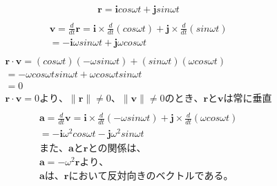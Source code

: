 \documentclass[dvipdfmx,uplatex]{jsarticle}
\begin{document}
  \begin{equation}
    \begin{aligned}
      &\bm{r} = \bm{i}cos\omega t + \bm{j}sin\omega t \nonumber\\
    \end{aligned}
  \end{equation}
  \begin{equation}
    \begin{aligned}
      &\bm{v} = \frac{d}{dt} \bm{r} = \bm{i} \times \frac{d}{dt}(cos\omega t) + \bm{j} \times \frac{d}{dt}(sin\omega t)\nonumber\\
      &= - \bm{i}\omega sin\omega t + \bm{j}\omega cos\omega t \nonumber\\
    \end{aligned}
  \end{equation}
  \begin{equation}
    \begin{aligned}
      &\bm{r} \cdot \bm{v} = (cos\omega t)(-\omega sin\omega t) + (sin\omega t)(\omega cos\omega t)\nonumber\\
      &=-\omega cos\omega t sin\omega t + \omega cos\omega t sin\omega t\nonumber\\
      &=0\nonumber\\
      &\bm{r} \cdot \bm{v} = 0 より、\|\bm{r}\|\neq0、\|\bm{v}\|\neq0のとき、\bm{r}と\bm{v}は常に垂直\\
    \end{aligned}
  \end{equation}
  \begin{equation}
    \begin{aligned}
      &\bm{a} = \frac{d}{dt}\bm{v} = \bm{i} \times \frac{d}{dt}(-\omega sin\omega t) + \bm{j} \times \frac{d}{dt}(\omega cos\omega t)\nonumber\\ 
      &=-\bm{i}\omega^2 cos\omega t - \bm{j}\omega^2 sin\omega t\nonumber\\
      &また、\bm{a}と\bm{r}との関係は、\\
      &\bm{a} = -\omega^2 \bm{r} より、\nonumber\\
      &\bm{a}は、\bm{r}において反対向きのベクトルである。\\
    \end{aligned}
  \end{equation}
\end{document}
